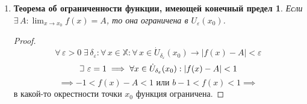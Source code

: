 \documentclass{article}
\theoremstyle{plain}
\def\letus{%
    \mathord{\setbox0=\hbox{$\exists$}%
             \hbox{\kern 0.125\wd0%
                   \vbox to \ht0{%
                      \hrule width 0.75\wd0%
                      \vfill%
                      \hrule width 0.75\wd0}%
                   \vrule height \ht0%
                   \kern 0.125\wd0}%
           }%
}
\begin{document}
\begin{enumerate}
\begin{enumerate}
\begin{proof}
                     $$\delta = \min{{\delta_{\varepsilon_1}, \delta_{\varepsilon_2}}}\;: \forall\, x \in \mathbb{X}\rightarrow 0 < |x - a| < \delta.$$
                     $$|\xi - \psi| \le |f(x) - \xi| + |f(x) - \psi| \le 2\varepsilon \implies$$
                     По \textbf{упрощай-лемме}: $|\xi - \psi| < \varepsilon,\; \varepsilon > 0 \implies \xi = \psi$.
            \end{proof}
        \end{enumerate}
        \item \newtheorem*{ogran*}{Теорема об ограниченности функции, имеющей конечный предел}
        \begin{ogran*}
        Если $\exists\, A: \lim_{x \to x_0}{f(x)} = A$, то она ограничена в $U_{\varepsilon}(x_0)$.
        \end{ogran*}
        \begin{proof}
               $$ \forall\, \varepsilon > 0\; \exists\, \delta_{\varepsilon}: \forall\, x \in \mathbb{X}: \forall\, x \in \dot{U}_{\delta_\varepsilon}(x_0) \rightarrow |f(x) - A| < \varepsilon$$
               $$\letus \,\, \varepsilon = 1\implies \forall x \in \dot{U}_{\delta_\varepsilon}(x_0): |f(x) - A| < 1$$
               $$\implies -1 < f(x) - A < 1 \text{ или } b - 1 < f(x) < 1\implies$$
               в какой-то окрестности точки $x_0$ функция ограничена.
        \end{proof}
\end{enumerate}
\end{document}
